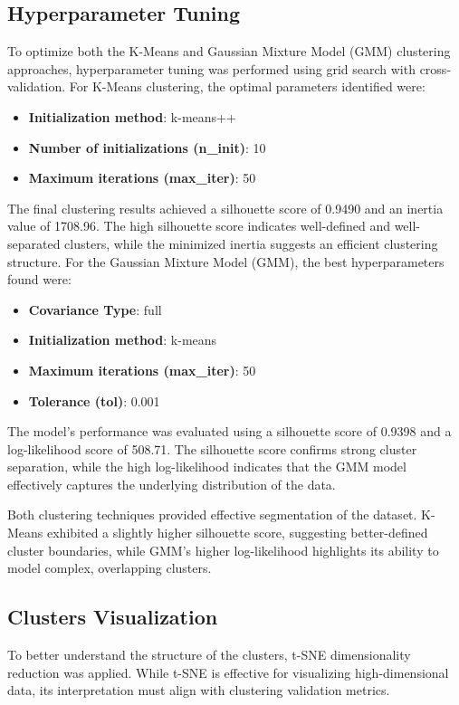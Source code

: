     \subsection{Hyperparameter Tuning}
    
    To optimize both the K-Means and Gaussian Mixture Model (GMM) clustering approaches, hyperparameter tuning was performed using grid search with cross-validation. For K-Means clustering, the optimal parameters identified were:
    \begin{itemize}
        \item \textbf{Initialization method}: k-means++
        \item \textbf{Number of initializations (n\_init)}: 10
        \item \textbf{Maximum iterations (max\_iter)}: 50
    \end{itemize}
    The final clustering results achieved a silhouette score of 0.9490 and an inertia value of 1708.96. The high silhouette score indicates well-defined and well-separated clusters, while the minimized inertia suggests an efficient clustering structure. For the Gaussian Mixture Model (GMM), the best hyperparameters found were:
    \begin{itemize}
        \item \textbf{Covariance Type}: full
        \item \textbf{Initialization method}: k-means
        \item \textbf{Maximum iterations (max\_iter)}: 50
        \item \textbf{Tolerance (tol)}: 0.001
    \end{itemize}
    The model's performance was evaluated using a silhouette score of 0.9398 and a log-likelihood score of 508.71. The silhouette score confirms strong cluster separation, while the high log-likelihood indicates that the GMM model effectively captures the underlying distribution of the data.
    
    Both clustering techniques provided effective segmentation of the dataset. K-Means exhibited a slightly higher silhouette score, suggesting better-defined cluster boundaries, while GMM’s higher log-likelihood highlights its ability to model complex, overlapping clusters.
    \subsection{Clusters Visualization}
    
        To better understand the structure of the clusters, t-SNE dimensionality reduction was applied. While t-SNE is effective for visualizing high-dimensional data, its interpretation must align with clustering validation metrics. 
        
